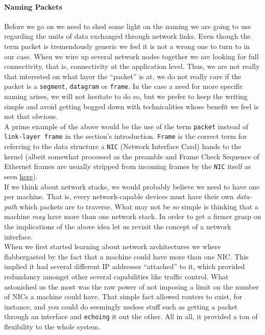          \paragraph{Naming Packets}
            Before we go on we need to shed some light on the naming we are going to use regarding the units of data exchanged through network links. Even though the term packet is tremendously generic we feel it is not a wrong one to turn to in our case. When we wire up several network nodes together we are looking for full connectivity, that is, connectivity at the application level. Thus, we are not really that interested on what layer the ``packet'' is at, we do not really care if the packet is a \texttt{segment}, \texttt{datagram} or \texttt{frame}. In the case a need for more specific naming arises, we will not hesitate to do so, but we prefer to keep the writing simple and avoid getting bogged down with technicalities whose benefit we feel is not that obvious.\\

            A prime example of the above would be the use of the term \texttt{packet} instead of \texttt{link-layer frame} in the section's introduction. \texttt{Frame} is the correct term for referring to the data structure a \texttt{NIC} (Network Interface Card) hands to the kernel (albeit somewhat processed as the preamble and Frame Check Sequence of Ethernet frames are usually stripped from incoming frames by the \texttt{NIC} itself as seen \href{https://gitlab.com/wireshark/wireshark/-/wikis/Ethernet}{here}).\\

        If we think about network stacks, we would probably believe we need to have one per machine. That is, every network-capable devices must have their own \textit{data-path} which packets are to traverse. What may not be so simple is thinking that a machine \textit{may} have more than one network stack. In order to get a firmer grasp on the implications of the above idea let us revisit the concept of a network interface.\\

        When we first started learning about network architectures we where flabbergasted by the fact that a machine could have more than one NIC. This implied it had several different IP addresses ``attached'' to it, which provided redundancy amongst other several capabilities like traffic control. What astonished us the most was the raw power of not imposing a limit on the number of NICs a machine could have. That simple fact allowed routers to exist, for instance, and you could do seemingly useless stuff such as getting a packet through an interface and \texttt{echoing} it out the other. All in all, it provided a ton of flexibility to the whole system.\\

